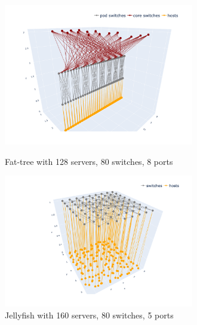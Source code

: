 \documentclass[a4paper,11pt]{article}
\begin{document}
    \begin{figure}[htbp]
    \centering
    \begin{minipage}[t]{0.48\textwidth}
    \centering
    \includegraphics[width=8.3cm]{fattree_k8.png}
    \caption{Fat-tree with 128 servers, 80 switches, 8 ports}
    \end{minipage}
    \begin{minipage}[t]{0.48\textwidth}
    \centering
    \includegraphics[width=8.3cm]{jellyfish_k8.png}
    \caption{Jellyfish with 160 servers, 80 switches, 5 ports}
    \end{minipage}
    \end{figure}
    
    
\end{document}
